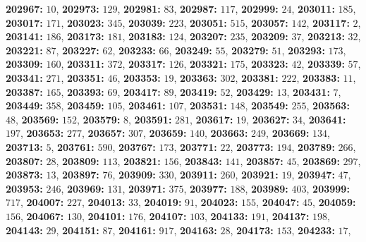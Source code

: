 \textsf{\bfseries 202967:} $10$, \textsf{\bfseries 202973:} $129$, \textsf{\bfseries 202981:} $83$, \textsf{\bfseries 202987:} $117$, \textsf{\bfseries 202999:} $24$, \textsf{\bfseries 203011:} $185$, \textsf{\bfseries 203017:} $171$, \textsf{\bfseries 203023:} $345$, \textsf{\bfseries 203039:} $223$, \textsf{\bfseries 203051:} $515$, \textsf{\bfseries 203057:} $142$, \textsf{\bfseries 203117:} $2$, \textsf{\bfseries 203141:} $186$, \textsf{\bfseries 203173:} $181$, \textsf{\bfseries 203183:} $124$, \textsf{\bfseries 203207:} $235$, \textsf{\bfseries 203209:} $37$, \textsf{\bfseries 203213:} $32$, \textsf{\bfseries 203221:} $87$, \textsf{\bfseries 203227:} $62$, \textsf{\bfseries 203233:} $66$, \textsf{\bfseries 203249:} $55$, \textsf{\bfseries 203279:} $51$, \textsf{\bfseries 203293:} $173$, \textsf{\bfseries 203309:} $160$, \textsf{\bfseries 203311:} $372$, \textsf{\bfseries 203317:} $126$, \textsf{\bfseries 203321:} $175$, \textsf{\bfseries 203323:} $42$, \textsf{\bfseries 203339:} $57$, \textsf{\bfseries 203341:} $271$, \textsf{\bfseries 203351:} $46$, \textsf{\bfseries 203353:} $19$, \textsf{\bfseries 203363:} $302$, \textsf{\bfseries 203381:} $222$, \textsf{\bfseries 203383:} $11$, \textsf{\bfseries 203387:} $165$, \textsf{\bfseries 203393:} $69$, \textsf{\bfseries 203417:} $89$, \textsf{\bfseries 203419:} $52$, \textsf{\bfseries 203429:} $13$, \textsf{\bfseries 203431:} $7$, \textsf{\bfseries 203449:} $358$, \textsf{\bfseries 203459:} $105$, \textsf{\bfseries 203461:} $107$, \textsf{\bfseries 203531:} $148$, \textsf{\bfseries 203549:} $255$, \textsf{\bfseries 203563:} $48$, \textsf{\bfseries 203569:} $152$, \textsf{\bfseries 203579:} $8$, \textsf{\bfseries 203591:} $281$, \textsf{\bfseries 203617:} $19$, \textsf{\bfseries 203627:} $34$, \textsf{\bfseries 203641:} $197$, \textsf{\bfseries 203653:} $277$, \textsf{\bfseries 203657:} $307$, \textsf{\bfseries 203659:} $140$, \textsf{\bfseries 203663:} $249$, \textsf{\bfseries 203669:} $134$, \textsf{\bfseries 203713:} $5$, \textsf{\bfseries 203761:} $590$, \textsf{\bfseries 203767:} $173$, \textsf{\bfseries 203771:} $22$, \textsf{\bfseries 203773:} $194$, \textsf{\bfseries 203789:} $266$, \textsf{\bfseries 203807:} $28$, \textsf{\bfseries 203809:} $113$, \textsf{\bfseries 203821:} $156$, \textsf{\bfseries 203843:} $141$, \textsf{\bfseries 203857:} $45$, \textsf{\bfseries 203869:} $297$, \textsf{\bfseries 203873:} $13$, \textsf{\bfseries 203897:} $76$, \textsf{\bfseries 203909:} $330$, \textsf{\bfseries 203911:} $260$, \textsf{\bfseries 203921:} $19$, \textsf{\bfseries 203947:} $47$, \textsf{\bfseries 203953:} $246$, \textsf{\bfseries 203969:} $131$, \textsf{\bfseries 203971:} $375$, \textsf{\bfseries 203977:} $188$, \textsf{\bfseries 203989:} $403$, \textsf{\bfseries 203999:} $717$, \textsf{\bfseries 204007:} $227$, \textsf{\bfseries 204013:} $33$, \textsf{\bfseries 204019:} $91$, \textsf{\bfseries 204023:} $155$, \textsf{\bfseries 204047:} $45$, \textsf{\bfseries 204059:} $156$, \textsf{\bfseries 204067:} $130$, \textsf{\bfseries 204101:} $176$, \textsf{\bfseries 204107:} $103$, \textsf{\bfseries 204133:} $191$, \textsf{\bfseries 204137:} $198$, \textsf{\bfseries 204143:} $29$, \textsf{\bfseries 204151:} $87$, \textsf{\bfseries 204161:} $917$, \textsf{\bfseries 204163:} $28$, \textsf{\bfseries 204173:} $153$, \textsf{\bfseries 204233:} $17$, 
